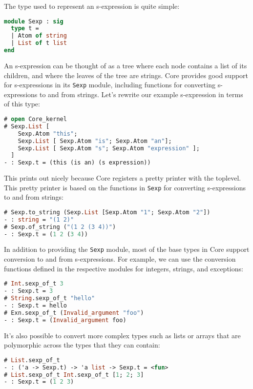 The type used to represent an s-expression is quite simple:

\begin{lstlisting}[language=Caml]
module Sexp : sig
  type t =
  | Atom of string
  | List of t list
end
\end{lstlisting}

An s-expression can be thought of as a tree where each node contains a
list of its children, and where the leaves of the tree are strings. Core
provides good support for s-expressions in its
\passthrough{\lstinline!Sexp!} module, including functions for
converting s-expressions to and from strings. Let's rewrite our example
s-expression in terms of this type:

\begin{lstlisting}[language=Caml]
# open Core_kernel
# Sexp.List [
    Sexp.Atom "this";
    Sexp.List [ Sexp.Atom "is"; Sexp.Atom "an"];
    Sexp.List [ Sexp.Atom "s"; Sexp.Atom "expression" ];
  ]
- : Sexp.t = (this (is an) (s expression))
\end{lstlisting}

This prints out nicely because Core registers a pretty printer with the
toplevel. This pretty printer is based on the functions in
\passthrough{\lstinline!Sexp!} for converting s-expressions to and from
strings: 

\begin{lstlisting}[language=Caml]
# Sexp.to_string (Sexp.List [Sexp.Atom "1"; Sexp.Atom "2"])
- : string = "(1 2)"
# Sexp.of_string ("(1 2 (3 4))")
- : Sexp.t = (1 2 (3 4))
\end{lstlisting}

In addition to providing the \passthrough{\lstinline!Sexp!} module, most
of the base types in Core support conversion to and from s-expressions.
For example, we can use the conversion functions defined in the
respective modules for integers, strings, and exceptions:

\begin{lstlisting}[language=Caml]
# Int.sexp_of_t 3
- : Sexp.t = 3
# String.sexp_of_t "hello"
- : Sexp.t = hello
# Exn.sexp_of_t (Invalid_argument "foo")
- : Sexp.t = (Invalid_argument foo)
\end{lstlisting}

It's also possible to convert more complex types such as lists or arrays
that are polymorphic across the types that they can contain:

\begin{lstlisting}[language=Caml]
# List.sexp_of_t
- : ('a -> Sexp.t) -> 'a list -> Sexp.t = <fun>
# List.sexp_of_t Int.sexp_of_t [1; 2; 3]
- : Sexp.t = (1 2 3)
\end{lstlisting}

